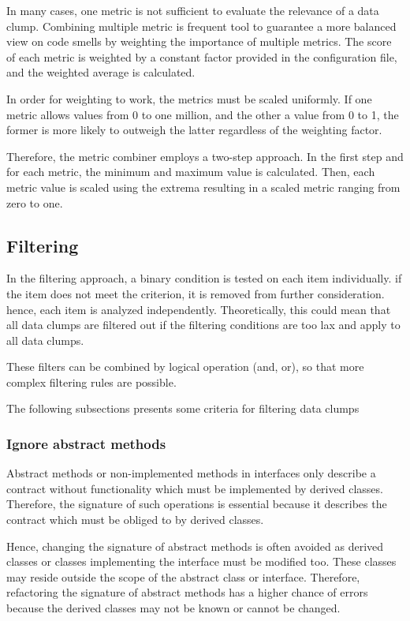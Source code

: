 In many cases, one metric is not sufficient to evaluate the relevance of a data clump. Combining multiple metric is frequent tool to guarantee a more balanced view on code smells by weighting the importance of multiple metrics. The score of each metric is weighted by a constant factor provided in the configuration file, and the weighted average is calculated. 

 In order for weighting to work, the metrics must be scaled uniformly. If one metric allows values from 0 to one million, and the other a value from 0 to 1, the former is more likely to outweigh the latter regardless of the weighting factor. 
 
 Therefore, the metric combiner employs a two-step approach. In the first step and for each metric, the minimum and maximum value is calculated. Then, each metric value is scaled using the extrema resulting in a scaled metric ranging from zero to one.  

\subsection{Filtering}
In the filtering approach, a binary condition is tested on each item individually. if the item does not meet the criterion, it is removed from further consideration. hence, each item is analyzed independently. Theoretically, this could mean that all data clumps are filtered out if the filtering conditions are too lax and apply to all data clumps. 

These filters can be combined by logical operation (and, or), so that more complex filtering rules are possible. 

The following subsections presents some  criteria for filtering data clumps
\subsubsection{Ignore abstract methods}

Abstract methods or non-implemented methods in interfaces only describe a contract without functionality which must be implemented by derived classes. Therefore, the signature of such operations is essential because it describes the contract which must be obliged to by derived classes.

Hence, changing the signature of abstract methods is often avoided as derived classes or classes implementing the interface must be modified too. These classes may reside outside the scope of the abstract class or interface. Therefore, refactoring the signature of abstract methods has a higher chance of errors because the derived classes may not be known or cannot be changed. 

